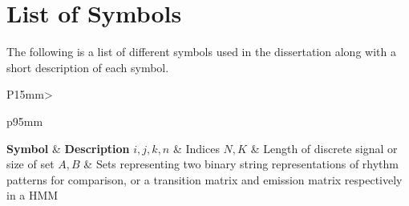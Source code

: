 \chapter*{List of Symbols} 
The following is a list of different symbols used in the dissertation along with a short description of each symbol.

\newcommand\listSymbol[3]{\protected\gdef#1{#2}#2 & #3 \tabularnewline \addlinespace[2pt]} 

\newcommand\nolistSymbol[3]{\protected\gdef#1{#2}} %

\begin{longtable}{P{15mm}>{\raggedright}p{95mm}}
	\toprule
	\textbf{Symbol} & \textbf{Description} \tabularnewline \midrule
	\endhead %
	\listSymbol{\inds}{\ensuremath{i, j, k, n}}{Indices}	
	\listSymbol{\inds}{\ensuremath{N, K}}{Length of discrete signal or size of set}	
	\listSymbol{\inds}{\ensuremath{A, B}}{Sets representing two binary string representations of rhythm patterns for comparison, or a transition matrix and emission matrix respectively in a HMM}

\end{longtable}
